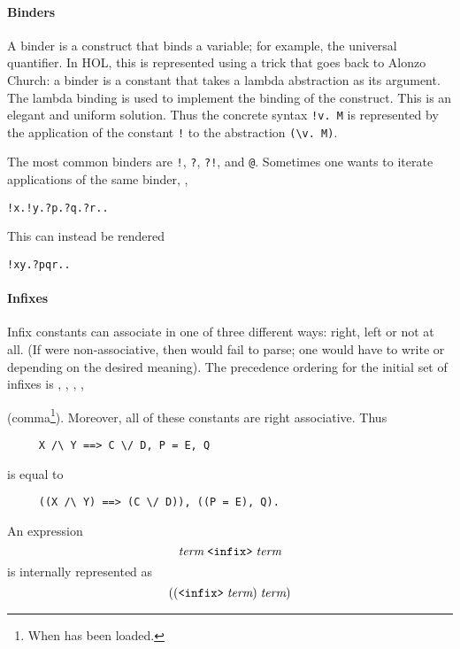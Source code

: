 {\paragraph{Binders}

A binder is a construct that binds a variable; for example, the
universal quantifier. In HOL, this is represented using a trick that
goes back to Alonzo Church: a binder is a constant that takes a lambda
abstraction as its argument. The lambda binding is used to implement
the binding of the construct. This is an elegant and uniform solution.
Thus the concrete syntax \verb+!v. M+ is represented by the
application of the constant \verb+!+ to the abstraction \verb+(\v. M)+.

The most common binders are \verb+!+, \verb+?+, \verb+?!+, and
\verb+@+. Sometimes one wants to iterate applications of the same
binder, \eg,
\begin{alltt}
  !x. !y. ?p. ?q. ?r. \term.
\end{alltt}
This can instead be rendered
\begin{alltt}
  !x y. ?p q r. \term.
\end{alltt}

\paragraph{Infixes}

Infix constants can associate in one of three different ways: right,
left or not at all.  (If \holtxt{+} were non-associative, then
 would fail to parse; one would have to write
 or  depending on the desired
meaning).  The precedence ordering for the initial set of infixes is
\holtxt{/\bs}, \holtxt{\bs/}, \holtxt{==>}, \holtxt{=},
 \begin{Large}\holtxt{,}\end{Large} (comma\footnote{When  has
   been loaded.}). Moreover, all of these constants are right
 associative. Thus
\begin{verbatim}
     X /\ Y ==> C \/ D, P = E, Q
\end{verbatim}
 is equal to
\begin{verbatim}
     ((X /\ Y) ==> (C \/ D)), ((P = E), Q).
\end{verbatim}

\noindent An expression
\[
\term \; \holtxt{<infix>}\; \term
\]
is internally represented as
\[
((\holtxt{<infix>}\; \term)\; \term)
\]

}
